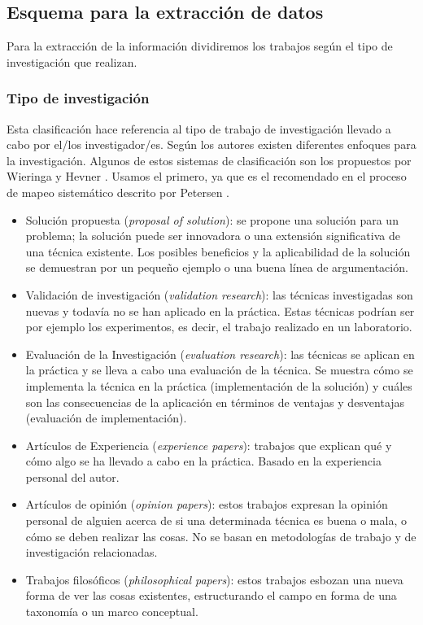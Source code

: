 \subsection{Esquema para la extracción de datos}

Para la extracción de la información dividiremos los trabajos según el tipo de investigación que realizan.

\subsubsection{Tipo de investigación}
Esta clasificación hace referencia al tipo de trabajo de investigación llevado a cabo por el/los investigador/es. Según los autores existen diferentes enfoques para la investigación. Algunos de estos sistemas de clasificación son los propuestos por Wieringa \cite{Wieringa:2005} y Hevner \cite{Hevner:2004}. Usamos el primero, ya que es el recomendado en el proceso de mapeo sistemático descrito por Petersen \cite{Petersen:2008}.
\begin{itemize}
\item Solución propuesta (\emph{proposal of solution}): se propone una solución para un problema; la solución puede ser innovadora o una extensión significativa de una técnica existente. Los posibles beneficios y la aplicabilidad de la solución se demuestran por un pequeño ejemplo o una buena línea de argumentación.
\item Validación de investigación (\emph{validation research}): las técnicas investigadas son nuevas y todavía no se han aplicado en la práctica. Estas técnicas podrían ser por ejemplo los experimentos, es decir, el trabajo realizado en un laboratorio.
\item Evaluación de la Investigación (\emph{evaluation research}): las técnicas se aplican en la práctica y se lleva a cabo una evaluación de la técnica. Se muestra cómo se implementa la técnica en la práctica (implementación de la solución) y cuáles son las consecuencias de la aplicación en términos de ventajas y desventajas (evaluación de implementación).
\item Artículos de Experiencia (\emph{experience papers}): trabajos que explican qué y cómo algo se ha llevado a cabo en la práctica. Basado en la experiencia personal del autor.
\item Artículos de opinión (\emph{opinion papers}): estos trabajos expresan la opinión personal de alguien acerca de si una determinada técnica es buena o mala, o cómo se deben realizar las cosas. No se basan en metodologías de trabajo y de investigación relacionadas.
\item Trabajos filosóficos (\emph{philosophical papers}): estos trabajos esbozan una nueva forma de ver las cosas existentes, estructurando el campo en forma de una taxonomía o un marco conceptual.
\end{itemize}

